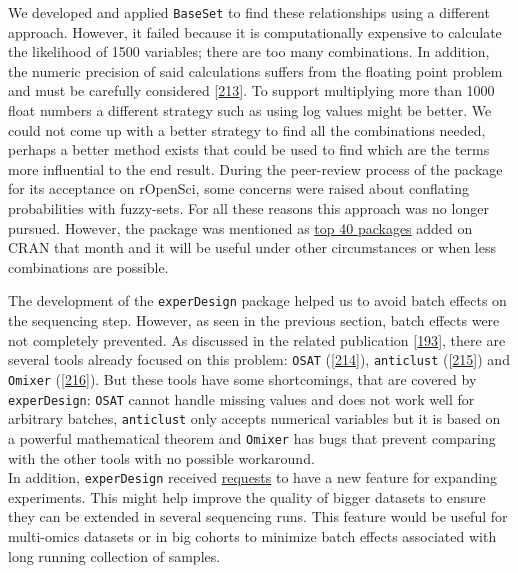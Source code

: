 \documentclass[
  12pt,
  a4paper,
  twoside,
  openright]{book}
\begin{document}
We developed and applied \texttt{BaseSet} to find these relationships using a different approach.
However, it failed because it is computationally expensive to calculate the likelihood of 1500 variables; there are too many combinations.
In addition, the numeric precision of said calculations suffers from the floating point problem and must be carefully considered {[}\protect\hyperlink{ref-goldberg1991}{213}{]}.
To support multiplying more than 1000 float numbers a different strategy such as using log values might be better.
We could not come up with a better strategy to find all the combinations needed, perhaps a better method exists that could be used to find which are the terms more influential to the end result.
During the peer-review process of the package for its acceptance on rOpenSci, some concerns were raised about conflating probabilities with fuzzy-sets.
For all these reasons this approach was no longer pursued.
However, the package was mentioned as \href{https://rviews.rstudio.com/2020/12/22/november-top-40-new-cran-packages/}{top 40 packages} added on CRAN that month and it will be useful under other circumstances or when less combinations are possible.

The development of the \texttt{experDesign} package helped us to avoid batch effects on the sequencing step.
However, as seen in the previous section, batch effects were not completely prevented.
As discussed in the related publication {[}\protect\hyperlink{ref-revillasancho2021}{193}{]}, there are several tools already focused on this problem: \texttt{OSAT} ({[}\protect\hyperlink{ref-yan2012}{214}{]}), \texttt{anticlust} ({[}\protect\hyperlink{ref-papenberg2020}{215}{]}) and \texttt{Omixer} ({[}\protect\hyperlink{ref-sinke2021}{216}{]}).
But these tools have some shortcomings, that are covered by \texttt{experDesign}: \texttt{OSAT} cannot handle missing values and does not work well for arbitrary batches, \texttt{anticlust} only accepts numerical variables but it is based on a powerful mathematical theorem and \texttt{Omixer} has bugs that prevent comparing with the other tools with no possible workaround.\\
In addition, \texttt{experDesign} received \href{https://github.com/llrs/experDesign/issues/22\#issuecomment-1033508578}{requests} to have a new feature for expanding experiments.
This might help improve the quality of bigger datasets to ensure they can be extended in several sequencing runs.
This feature would be useful for multi-omics datasets or in big cohorts to minimize batch effects associated with long running collection of samples.
\end{document}
